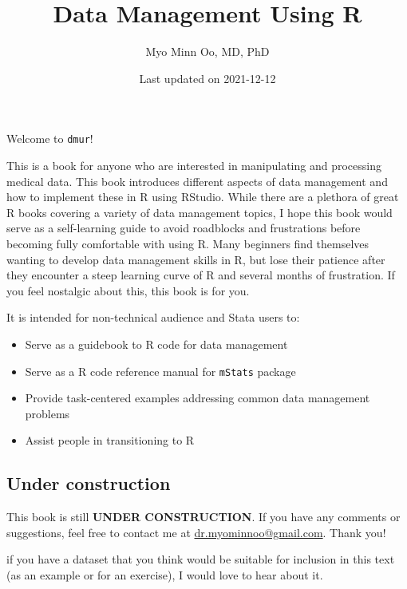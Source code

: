 \documentclass[
]{book}
\title{Data Management Using R}
\author{Myo Minn Oo, MD, PhD}
\date{Last updated on 2021-12-12}
\providecommand{\tightlist}{%
  \setlength{\itemsep}{0pt}\setlength{\parskip}{0pt}}
\begin{document}
\maketitle

{
\setcounter{tocdepth}{1}
\tableofcontents
}
\hypertarget{section}{%
\chapter*{}\label{section}}

Welcome to \texttt{dmur}!

This is a book for anyone who are interested in manipulating and processing medical data. This book introduces different aspects of data management and how to implement these in R using RStudio. While there are a plethora of great R books covering a variety of data management topics, I hope this book would serve as a self-learning guide to avoid roadblocks and frustrations before becoming fully comfortable with using R. Many beginners find themselves wanting to develop data management skills in R, but lose their patience after they encounter a steep learning curve of R and several months of frustration. If you feel nostalgic about this, this book is for you.

It is intended for non-technical audience and Stata users to:

\begin{itemize}
\tightlist
\item
  Serve as a guidebook to R code for data management
\item
  Serve as a R code reference manual for \texttt{mStats} package
\item
  Provide task-centered examples addressing common data management problems
\item
  Assist people in transitioning to R
\end{itemize}

\hypertarget{under-construction}{%
\section*{Under construction}\label{under-construction}}

This book is still \textbf{UNDER CONSTRUCTION}. If you have any comments or suggestions, feel free to contact me at \href{mailto::dr.myominnoo@gmail.com}{dr.myominnoo@gmail.com}. Thank you!

if you have a dataset that you think would be suitable for inclusion in this text (as an example or for an exercise), I would love to hear about it.
\end{document}
